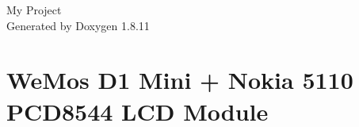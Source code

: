 \documentclass[twoside]{book}
\newcommand{\+}{\discretionary{\mbox{\scriptsize$\hookleftarrow$}}{}{}}
\newcommand{\clearemptydoublepage}{%
  \newpage{\pagestyle{empty}\cleardoublepage}%
}
\begin{document}
\hypersetup{pageanchor=false,
             bookmarksnumbered=true,
             pdfencoding=unicode
            }
\begin{titlepage}
\vspace*{7cm}
\begin{center}%
{\Large My Project }\\
\vspace*{1cm}
{\large Generated by Doxygen 1.8.11}\\
\end{center}
\end{titlepage}
\clearemptydoublepage
\tableofcontents
\clearemptydoublepage
{}
\hypersetup{pageanchor=true}

\chapter{We\+Mos D1 Mini + Nokia 5110 P\+C\+D8544 L\+CD Module}
\label{md_readme}
\hypertarget{md_readme}{}


\backmatter
\newpage
{}
\clearemptydoublepage
{}
\printindex
\end{document}
